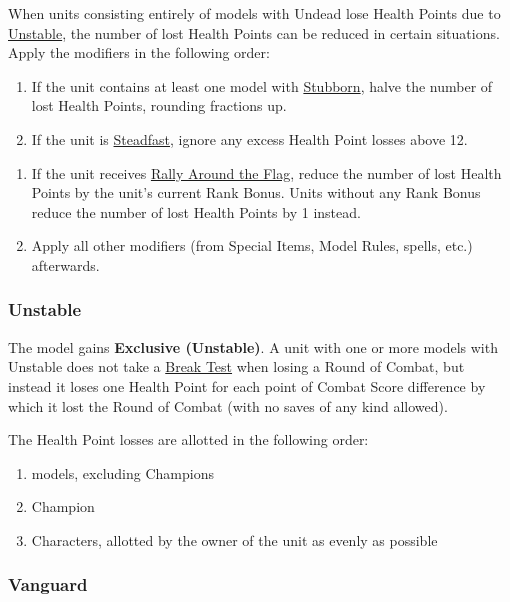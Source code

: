 When units consisting entirely of models with Undead lose Health Points due to \hyperref[unstable]{Unstable}, the number of lost Health Points can be reduced in certain situations. Apply the modifiers in the following order:
\begin{enumerate}
	\item If the unit contains at least one model with \hyperref[stubborn]{Stubborn}, halve the number of lost Health Points, rounding fractions up.
	\item If the unit is \hyperref[steadfast]{Steadfast}, ignore any excess Health Point losses above 12.
\end{enumerate}

\begin{enumerate}[resume]
	\item If the unit receives \hyperref[rally_around_the_flag]{Rally Around the Flag}, reduce the number of lost Health Points by the unit's current Rank Bonus. Units without any Rank Bonus reduce the number of lost Health Points by 1 instead.
	\item Apply all other modifiers (from Special Items, Model Rules, spells, etc.) afterwards.
\end{enumerate}

\columnbreak

\subsubsection{Unstable}
\idx[main=y]{\unstable}\label{unstable}

The model gains \textbf{Exclusive (Unstable)}. A unit with one or more models with Unstable does not take a \hyperref[break_test]{Break Test} when losing a Round of Combat, but instead it loses one Health Point for each point of Combat Score difference by which it lost the Round of Combat (with no saves of any kind allowed).

The Health Point losses are allotted in the following order:
\begin{enumerate}
	\item \rnf{} models, excluding Champions
	\item Champion
	\item Characters, allotted by the owner of the unit as evenly as possible
\end{enumerate}

\subsubsection{Vanguard}
\idx[main=y]{\vanguard}\label{vanguard}

